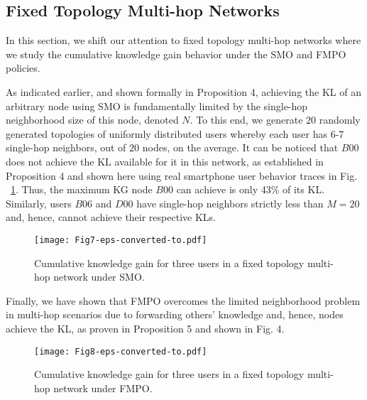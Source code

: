 \documentclass[conference]{IEEEtran}
\theoremstyle{definition}
\begin{document}
\subsection{Fixed Topology Multi-hop Networks}
\vspace{-0.1 cm}

In this section, we shift our attention to fixed topology multi-hop networks 
where we study the cumulative knowledge gain behavior under the SMO and FMPO policies.

As indicated earlier, and shown formally in Proposition 4, achieving the KL of an arbitrary node using SMO is fundamentally limited by the single-hop neighborhood size of this node, denoted $N$.
To this end, we generate $20$ randomly generated topologies of uniformly distributed users whereby each user has 6-7 single-hop neighbors, out of $20$ nodes, on the average. It can be noticed that $B00$ 
does not achieve the KL available for it in this network, as established in Proposition 4 and shown here using real smartphone user behavior traces in Fig. ~\ref{fig:B00_SMHOP)}. Thus, the maximum KG node $B00$ can achieve is only 43\% of its KL. Similarly, users $B06$ and $D00$ have single-hop neighbors strictly less than $M=20$ and, hence, cannot achieve their respective KLs. 
\begin{figure}[!bp]
\centerline{\texttt{[image: Fig7-eps-converted-to.pdf]}}
\caption{Cumulative knowledge gain for three users in a fixed topology multi-hop network under SMO.}\label{fig:B00_SMHOP)}
\end{figure} 




Finally, we have shown that FMPO overcomes the limited neighborhood problem in multi-hop scenarios due to forwarding others' knowledge and, hence, nodes achieve the KL, as proven in Proposition 5 and shown in Fig. 4. 


\begin{figure}[!bp]
\centerline  {   \texttt{[image: Fig8-eps-converted-to.pdf]}}
\caption{Cumulative knowledge gain for three users in a fixed topology multi-hop network under FMPO.}\label{fig:B00_SMHOP_MO)}
\end{figure}
\end{document}
